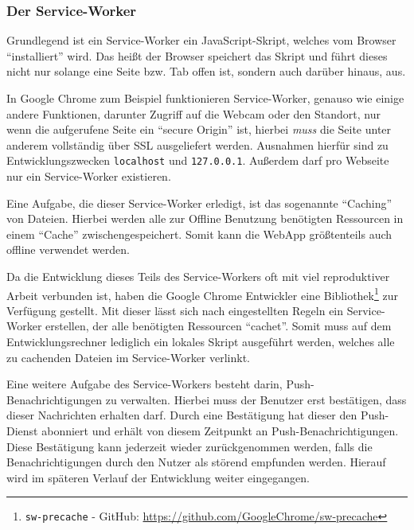 \documentclass[a4paper,12pt,ngerman,listof=numbered]{scrartcl}      %
\providecommand{\inlinecode}[1]{\texttt{#1}}
\begin{document}
	\subsubsection{Der Service-Worker}
	Grundlegend ist ein Service-Worker ein JavaScript-Skript, welches vom Browser ``installiert'' wird. Das heißt der Browser speichert das Skript und führt dieses nicht nur solange eine Seite bzw. Tab offen ist, sondern auch darüber hinaus, aus.\par
	In Google Chrome zum Beispiel funktionieren Service-Worker, genauso wie einige andere Funktionen, darunter Zugriff auf die Webcam oder den Standort, nur wenn die aufgerufene Seite ein ``secure Origin'' ist, hierbei \emph{muss} die Seite unter anderem vollständig über SSL ausgeliefert werden. Ausnahmen hierfür sind zu Entwicklungszwecken \inlinecode{localhost} und \inlinecode{127.0.0.1}. Außerdem darf pro Webseite nur ein Service-Worker existieren.\par
	Eine Aufgabe, die dieser Service-Worker erledigt, ist das sogenannte ``Caching'' von Dateien. Hierbei werden alle zur Offline Benutzung benötigten Ressourcen in einem ``Cache'' zwischengespeichert. Somit kann die WebApp größtenteils auch offline verwendet werden.\par
	Da die Entwicklung dieses Teils des Service-Workers oft mit viel reproduktiver Arbeit verbunden ist, haben die Google Chrome Entwickler eine Bibliothek\footnote{\inlinecode{sw-precache} - GitHub: \url{https://github.com/GoogleChrome/sw-precache}} zur Verfügung gestellt. Mit dieser lässt sich nach eingestellten Regeln ein Service-Worker erstellen, der alle benötigten Ressourcen ``cachet''. Somit muss auf dem Entwicklungsrechner lediglich ein lokales Skript ausgeführt werden, welches alle zu cachenden Dateien im Service-Worker verlinkt.\par
	Eine weitere Aufgabe des Service-Workers besteht darin, Push-Be\-nach\-rich\-ti\-gungen zu verwalten. Hierbei muss der Benutzer erst bestätigen, dass dieser Nachrichten erhalten darf. Durch eine Bestätigung hat dieser den Push-Dienst abonniert und erhält von diesem Zeitpunkt an Push-Benachrichtigungen. Diese Bestätigung kann jederzeit wieder zurückgenommen werden, falls die Benachrichtigungen durch den Nutzer als störend empfunden werden. Hierauf wird im späteren Verlauf der Entwicklung weiter eingegangen.\par
	
\end{document}
